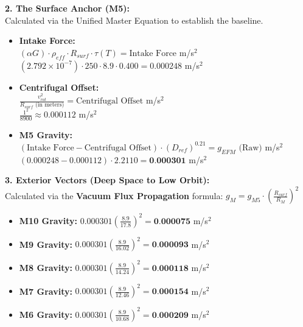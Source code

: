 \documentclass[11pt, a4paper]{article}
\begin{document}
  \vspace{1.0em}
  \noindent \textbf{2. The Surface Anchor (M5):} \\
  \hspace*{1em} Calculated via the Unified Master Equation to establish the baseline.
  \begin{itemize}
    \item \textbf{Intake Force:} \\[0.5em]
    \hspace*{2em} $(\alpha G) \cdot \rho_{eff} \cdot R_{surf} \cdot \tau(T) = \text{Intake Force}$ m/s$^2$ \\[1em]
    \hspace*{2em} $(2.792 \times 10^{-7}) \cdot 250 \cdot 8.9 \cdot 0.400 = 0.000248$ m/s$^2$
    
    \item \textbf{Centrifugal Offset:} \\[0.5em]
    \hspace*{2em} $\frac{v_{rot}^2}{R_{surf} \text{ (in meters)}} = \text{Centrifugal Offset}$ m/s$^2$ \\[1em]
    \hspace*{2em} $\frac{1^2}{8900} \approx 0.000112$ m/s$^2$
    
    \item \textbf{M5 Gravity:} \\[0.5em]
    \hspace*{2em} $(\text{Intake Force} - \text{Centrifugal Offset}) \cdot (D_{ref})^{0.21} = g_{EFM} \text{ (Raw)}$ m/s$^2$ \\[1em]
    \hspace*{2em} $(0.000248 - 0.000112) \cdot 2.2110 = \textbf{0.000301}$ m/s$^2$
  \end{itemize}

  \clearpage
  \noindent \textbf{3. Exterior Vectors (Deep Space to Low Orbit):} \\
  \hspace*{1em} Calculated via the \textbf{Vacuum Flux Propagation} formula: $g_M = g_{M5} \cdot \left( \frac{R_{surf}}{R_M} \right)^2$
  \begin{itemize}
    \item \textbf{M10 Gravity:} $0.000301 \left( \frac{8.9}{17.8} \right)^2 = \textbf{0.000075}$ m/s$^2$
    \item \textbf{M9 Gravity:} $0.000301 \left( \frac{8.9}{16.02} \right)^2 = \textbf{0.000093}$ m/s$^2$
    \item \textbf{M8 Gravity:} $0.000301 \left( \frac{8.9}{14.24} \right)^2 = \textbf{0.000118}$ m/s$^2$
    \item \textbf{M7 Gravity:} $0.000301 \left( \frac{8.9}{12.46} \right)^2 = \textbf{0.000154}$ m/s$^2$
    \item \textbf{M6 Gravity:} $0.000301 \left( \frac{8.9}{10.68} \right)^2 = \textbf{0.000209}$ m/s$^2$
  \end{itemize}
\end{document}
